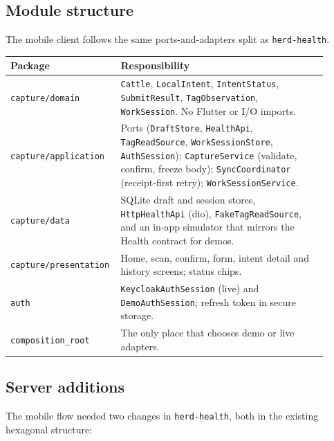 \subsection{Module structure}\label{sec:m2-mobile-modules}

The mobile client follows
the same ports-and-adapters split as \texttt{herd-health}.

{\small
\begin{longtable}{|p{0.27\linewidth}|p{0.64\linewidth}|}
\hline
\textbf{Package} & \textbf{Responsibility} \\ \hline
\endhead
\texttt{capture/domain} & \texttt{Cattle}, \texttt{LocalIntent},
\texttt{IntentStatus}, \texttt{SubmitResult}, \texttt{TagObservation},
\texttt{WorkSession}. No Flutter or I/O imports. \\ \hline
\texttt{capture/application} & Ports (\texttt{DraftStore},
\texttt{HealthApi}, \texttt{TagReadSource}, \texttt{WorkSessionStore},
\texttt{AuthSession}); \texttt{CaptureService} (validate, confirm,
freeze body); \texttt{SyncCoordinator} (receipt-first retry);
\texttt{WorkSessionService}. \\ \hline
\texttt{capture/data} & SQLite draft and session stores,
\texttt{HttpHealthApi} (dio), \texttt{FakeTagReadSource}, and an
in-app simulator that mirrors the Health contract for demos. \\ \hline
\texttt{capture/presentation} & Home, scan, confirm, form, intent
detail and history screens; status chips. \\ \hline
\texttt{auth} & \texttt{KeycloakAuthSession} (live) and
\texttt{DemoAuthSession}; refresh token in secure storage. \\ \hline
\texttt{composition\_root} & The only place that chooses demo or live
adapters. \\ \hline
\end{longtable}
}

\subsection{Server additions}\label{sec:m2-mobile-server}

The mobile flow needed two changes in \texttt{herd-health}, both in the
existing hexagonal structure:

